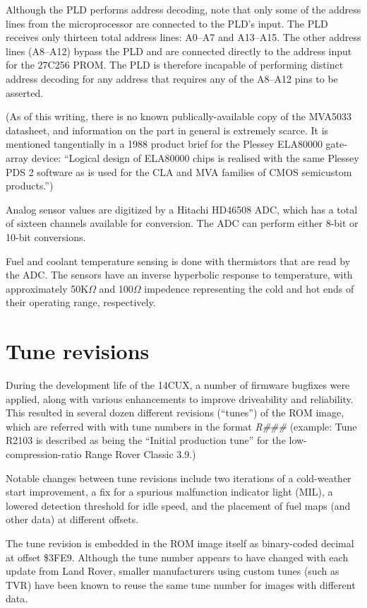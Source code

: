\documentclass[11pt,twocolumn]{scrartcl}
\begin{document}
Although the PLD performs address decoding, note that only some of the address lines from the microprocessor are connected to the PLD's input. The PLD receives only thirteen total address lines: A0--A7 and A13--A15. The other address lines (A8--A12) bypass the PLD and are connected directly to the address input for the 27C256 PROM. The PLD is therefore incapable of performing distinct address decoding for any address that requires any of the A8--A12 pins to be asserted.

(As of this writing, there is no known publically-available copy of the MVA5033 datasheet, and information on the part in general is extremely scarce. It is mentioned tangentially in a 1988 product brief for the Plessey ELA80000 gate-array device: ``Logical design of ELA80000 chips is realised with the same Plessey PDS 2 software as is used for the CLA and MVA families of CMOS semicustom products.'')

Analog sensor values are digitized by a Hitachi HD46508 ADC, which has a total of sixteen channels available for conversion. The ADC can perform either 8-bit or 10-bit conversions.

Fuel and coolant temperature sensing is done with thermistors that are read by the ADC. The sensors have an inverse hyperbolic response to temperature, with approximately 50K$\Omega$ and 100$\Omega$ impedence representing the cold and hot ends of their operating range, respectively.

\section {Tune revisions}
During the development life of the 14CUX, a number of firmware bugfixes were applied, along with various enhancements to improve driveability and reliability. This resulted in several dozen different revisions (``tunes'') of the ROM image, which are referred with with tune numbers in the format {\em R\#\#\#} (example: Tune R2103 is described as being the ``Initial production tune'' for the low-compression-ratio Range Rover Classic 3.9.)

Notable changes between tune revisions include two iterations of a cold-weather start improvement, a fix for a spurious malfunction indicator light (MIL), a lowered detection threshold for idle speed, and the placement of fuel maps (and other data) at different offsets.

The tune revision is embedded in the ROM image itself as binary-coded decimal at offset \$3FE9. Although the tune number appears to have changed with each update from Land Rover, smaller manufacturers using custom tunes (such as TVR) have been known to reuse the same tune number for images with different data.
\end{document}
